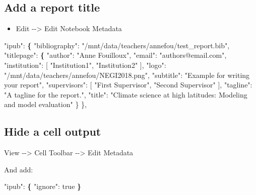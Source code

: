 \documentclass[10pt,parskip=half,
	toc=sectionentrywithdots,
	bibliography=totocnumbered,
	captions=tableheading,numbers=noendperiod]{scrartcl}
\providecommand{\tightlist}{%
  \setlength{\itemsep}{0pt}\setlength{\parskip}{0pt}}
\newenvironment{Shaded}{}{}
\newcommand{\KeywordTok}[1]{\textcolor[rgb]{0.00,0.44,0.13}{\textbf{{#1}}}}
\newcommand{\StringTok}[1]{\textcolor[rgb]{0.25,0.44,0.63}{{#1}}}
\newcommand{\FunctionTok}[1]{\textcolor[rgb]{0.02,0.16,0.49}{{#1}}}
\newcommand{\NormalTok}[1]{{#1}}
\newcommand{\BuiltInTok}[1]{{#1}}
\begin{document}
\subsection{Add a report title}\label{add-a-report-title}

\begin{itemize}
\tightlist
\item
  Edit -\/-\textgreater{} Edit Notebook Metadata
\end{itemize}

\begin{Shaded}
\begin{Highlighting}[]
 \StringTok{"ipub"}\NormalTok{: }\KeywordTok{\{}
    \StringTok{"bibliography"}\NormalTok{: }\StringTok{"/mnt/data/teachers/annefou/test_report.bib"}\NormalTok{,}
    \StringTok{"titlepage"}\NormalTok{: }\KeywordTok{\{}
      \StringTok{"author"}\NormalTok{: }\StringTok{"Anne Fouilloux"}\NormalTok{,}
      \StringTok{"email"}\NormalTok{: }\StringTok{"authors@email.com"}\NormalTok{,}
      \StringTok{"institution"}\NormalTok{:}\BuiltInTok{ [}
        \StringTok{"Institution1"}\NormalTok{,}
        \StringTok{"Institution2"}
\NormalTok{      ],}
      \StringTok{"logo"}\NormalTok{: }\StringTok{"/mnt/data/teachers/annefou/NEGI2018.png"}\NormalTok{,}
      \StringTok{"subtitle"}\NormalTok{: }\StringTok{"Example for writing your report"}\NormalTok{,}
      \StringTok{"supervisors"}\NormalTok{: [}
        \StringTok{"First Supervisor"}\NormalTok{,}
        \StringTok{"Second Supervisor"}
\NormalTok{      ],}
      \StringTok{"tagline"}\NormalTok{: }\StringTok{"A tagline for the report."}\NormalTok{,}
      \StringTok{"title"}\NormalTok{: }\StringTok{"Climate science at high latitudes: Modeling and model evaluation"}
\NormalTok{    \}}
\NormalTok{  \},}
\end{Highlighting}
\end{Shaded}

\subsection{Hide a cell output}\label{hide-a-cell-output}

View -\/-\textgreater{} Cell Toolbar -\/-\textgreater{} Edit Metadata

And add:

\begin{Shaded}
\begin{Highlighting}[]
  \StringTok{"ipub"}\NormalTok{: }\KeywordTok{\{}
    \StringTok{"ignore"}\NormalTok{: }\FunctionTok{true}
  \KeywordTok{\}}
\end{Highlighting}
\end{Shaded}
\end{document}
